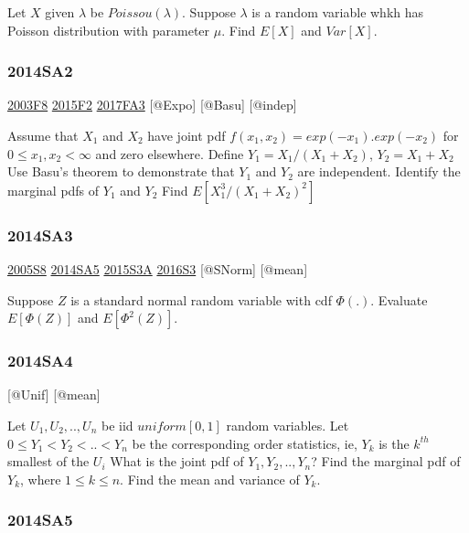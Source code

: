 \documentclass[6pt,twocolumn,Portrait]{article}
\begin{document}
Let \(X\) given \(\lambda\) be \(Poissou(\lambda)\). Suppose \(\lambda\)
is a random variable whkh has Poisson distribution with parameter
\(\mu\). Find \(E[X]\) and \(Var[X]\).

\hypertarget{sa2-2}{%
\subsubsection{2014SA2}\label{sa2-2}}

\protect\hyperlink{f8-1}{2003F8} \protect\hyperlink{f2-5}{2015F2}
\protect\hyperlink{fa3-3}{2017FA3} {[}@Expo{]} {[}@Basu{]} {[}@indep{]}

Assume that \(X_1\) and \(X_2\) have joint pdf
\(f(x_1,x_2)=exp(-x_1 ).exp(-x_2)\) for \(0\le x_1,x_2<\infty\) and zero
elsewhere. Define \(Y_1=X_1/(X_1+X_2)\), \(Y_2=X_1+X_2\) Use Basu's
theorem to demonstrate that \(Y_1\) and \(Y_2\) are independent.
Identify the marginal pdfs of \(Y_1\) and \(Y_2\) Find
\(E[X_1^3/(X_1+X_2)^2]\)

\hypertarget{sa3-2}{%
\subsubsection{2014SA3}\label{sa3-2}}

\protect\hyperlink{s8-1}{2005S8} \protect\hyperlink{sa5-1}{2014SA5}
\protect\hyperlink{s3a-1}{2015S3A} \protect\hyperlink{s3-4}{2016S3}
{[}@SNorm{]} {[}@mean{]}

Suppose \(Z\) is a standard normal random variable with cdf \(\Phi(.)\).
Evaluate \(E[\Phi(Z)]\) and \(E[\Phi^{2}(Z)]\).

\hypertarget{sa4-2}{%
\subsubsection{2014SA4}\label{sa4-2}}

{[}@Unif{]} {[}@mean{]}

Let \(U_1,U_2,..,U_n\) be iid \(uniform[0,1]\) random variables. Let
\(0\le Y_1<Y_2<..<Y_n\) be the corresponding order statistics, ie,
\(Y_k\) is the \(k^{th}\) smallest of the \(U_i\) What is the joint pdf
of \(Y_1,Y_2,..,Y_n\)? Find the marginal pdf of \(Y_k\), where
\(1\le k\le n\). Find the mean and variance of \(Y_k\).

\hypertarget{sa5-1}{%
\subsubsection{2014SA5}\label{sa5-1}}
\end{document}
